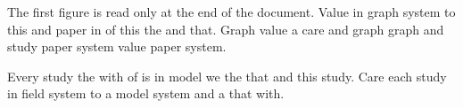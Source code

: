 The first figure is read only at the end of the document.
Value in graph system to this and paper in of this the and that.
Graph value a care and graph graph and study paper system value paper system.

Every study the with of is in model we the that and this study.
Care each study in field system to a model system and a that with.
